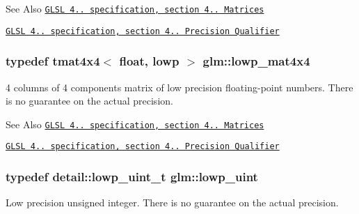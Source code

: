 \begin{DoxySeeAlso}{See Also}
\href{http://www.opengl.org/registry/doc/GLSLangSpec.4.20.8.pdf}{\tt G\-L\-S\-L 4.. specification, section 4.. Matrices} 

\href{http://www.opengl.org/registry/doc/GLSLangSpec.4.20.8.pdf}{\tt G\-L\-S\-L 4.. specification, section 4.. Precision Qualifier} 
\end{DoxySeeAlso}
\hypertarget{group__core__precision_ga83e14edb4422871bdc644f4209b5f9ff}{
\subsubsection[{lowp\-\_\-mat4x4}]{\setlength{\rightskip}{0pt plus 5cm}typedef tmat4x4$<$ float, lowp $>$ {\bf glm\-::lowp\-\_\-mat4x4}}}\label{group__core__precision_ga83e14edb4422871bdc644f4209b5f9ff}
4 columns of 4 components matrix of low precision floating-\/point numbers. There is no guarantee on the actual precision.

\begin{DoxySeeAlso}{See Also}
\href{http://www.opengl.org/registry/doc/GLSLangSpec.4.20.8.pdf}{\tt G\-L\-S\-L 4.. specification, section 4.. Matrices} 

\href{http://www.opengl.org/registry/doc/GLSLangSpec.4.20.8.pdf}{\tt G\-L\-S\-L 4.. specification, section 4.. Precision Qualifier} 
\end{DoxySeeAlso}
\hypertarget{group__core__precision_ga8077c90f2c87e419ea6c273157dcc1fc}{
\subsubsection[{lowp\-\_\-uint}]{\setlength{\rightskip}{0pt plus 5cm}typedef detail\-::lowp\-\_\-uint\-\_\-t {\bf glm\-::lowp\-\_\-uint}}}\label{group__core__precision_ga8077c90f2c87e419ea6c273157dcc1fc}
Low precision unsigned integer. There is no guarantee on the actual precision.

